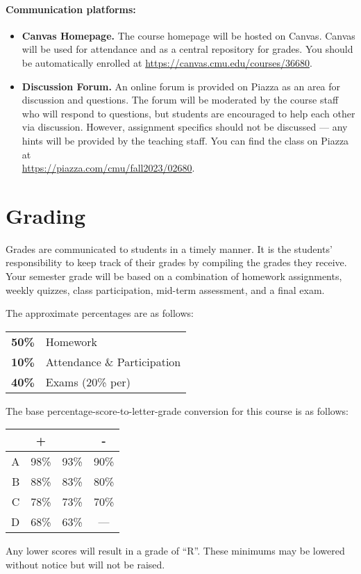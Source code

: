 \documentclass[12pt]{scrartcl}
\begin{document}
\paragraph{Communication platforms:}
\begin{itemize}
\item \textbf{Canvas Homepage.} 
The course homepage will be hosted on Canvas. 
Canvas will be used for attendance and as a central repository for grades. 
You should be automatically enrolled at \url{https://canvas.cmu.edu/courses/36680}.
\item \textbf{Discussion Forum.} 
An online forum is provided on Piazza as an area for discussion and questions. 
The forum will be moderated by the course staff who will respond to questions, 
but students are encouraged to help each other via discussion. 
However, assignment specifics should not be discussed --- 
any hints will be provided by the teaching staff. 
You can find the class on Piazza at\\ \url{https://piazza.com/cmu/fall2023/02680}.
\end{itemize}

\section{Grading}

Grades are communicated to students in a timely manner. 
It is the students’ responsibility to keep track of their grades by compiling the grades they receive. 
Your semester grade will be based on a combination of homework assignments, weekly quizzes, class participation,  mid-term assessment, and a final exam. 

The approximate percentages are as follows:
\begin{center}
\begin{tabular}{rl}
\textbf{50\% } & Homework\\
\textbf{10\% } & Attendance \& Participation\\
\textbf{40\% } & Exams (20\% per)\\
\end{tabular}
\end{center}

The base percentage-score-to-letter-grade conversion for this course is as follows: 

\begin{center}
\begin{tabular}{r|ccc}
 & + & & -\\
 \hline
A & 98\% & 93\% & 90\%\\
B & 88\% & 83\% & 80\%\\
C & 78\% & 73\% & 70\%\\
D & 68\% & 63\% & ---\\
\end{tabular}
\end{center}
Any lower scores will result in a grade of ``R''.
These minimums may be lowered without notice but will not be raised. 
\end{document}
